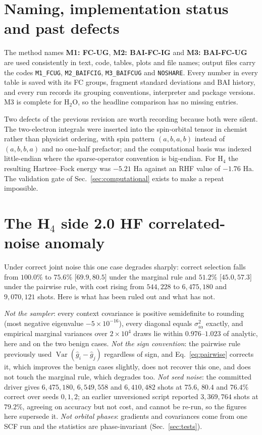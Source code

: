 \documentclass[10pt]{article}
\newcommand{\Var}{\operatorname{Var}}
\begin{document}
\section{Naming, implementation status and past defects}
\label{app:naming}
\label{app:status}

The method names \textbf{M1: FC-UG}, \textbf{M2: BAI-FC-IG} and \textbf{M3:
BAI-FC-UG} are used consistently in text, code, tables, plots and file names;
output files carry the codes \texttt{M1\_FCUG}, \texttt{M2\_BAIFCIG},
\texttt{M3\_BAIFCUG} and \texttt{NOSHARE}. Every number in every table is saved
with its FC groups, fragment standard deviations and BAI history, and every run
records its grouping conventions, interpreter and package versions. M3 is
complete for H$_2$O, so the headline comparison has no missing entries.

Two defects of the previous revision are worth recording because both were
silent. The two-electron integrals were inserted into the spin-orbital tensor in
chemist rather than physicist ordering, with spin pattern $(a,b,a,b)$ instead of
$(a,b,b,a)$ and no one-half prefactor; and the computational basis was indexed
little-endian where the sparse-operator convention is big-endian. For H$_4$ the
resulting Hartree--Fock energy was $-5.21$ Ha against an RHF value of $-1.76$ Ha.
The validation gate of Sec.~\ref{sec:computational} exists to make a repeat
impossible.

\section{The H\texorpdfstring{$_4$}{4} side 2.0 HF correlated-noise anomaly}
\label{app:anomaly}

Under correct joint noise this one case degrades sharply: correct selection falls
from $100.0\%$ to $75.6\%$ [$69.9,80.5$] under the marginal rule and $51.2\%$
[$45.0,57.3$] under the pairwise rule, with cost rising from $544{,}228$ to
$6{,}475{,}180$ and $9{,}070{,}121$ shots. Here is what has been ruled out and
what has not.

\emph{Not the sampler}: every context covariance is positive semidefinite to
rounding (most negative eigenvalue $-5\times10^{-16}$), every diagonal equals
$\sigma_{i\alpha}^2$ exactly, and empirical marginal variances over $2\times10^4$
draws lie within $0.976$--$1.023$ of analytic, here and on the two benign cases.
\emph{Not the sign convention}: the pairwise rule previously used
$\Var(\widehat g_i-\widehat g_j)$ regardless of sign, and Eq.~\eqref{eq:pairwise}
corrects it, which improves the benign cases slightly, does not recover this one,
and does not touch the marginal rule, which degrades too. \emph{Not seed noise}:
the committed driver gives $6{,}475{,}180$, $6{,}549{,}558$ and $6{,}410{,}482$
shots at $75.6$, $80.4$ and $76.4\%$ correct over seeds $0,1,2$; an earlier
unversioned script reported $3{,}369{,}764$ shots at $79.2\%$, agreeing on
accuracy but not cost, and cannot be re-run, so the figures here supersede it.
\emph{Not orbital phases}: gradients and covariances come from one SCF run and
the statistics are phase-invariant (Sec.~\ref{sec:tests}).
\end{document}
